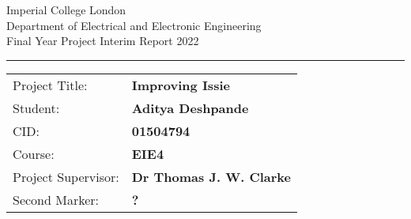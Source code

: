 \begin{titlepage}
                \setlength{\parindent}{0pt}
                \setlength{\parskip}{0pt}

                {
                                \Large
                                \raggedright
                                Imperial College London\\[17pt]
                                Department of Electrical and Electronic Engineering\\[17pt]
                                Final Year Project Interim Report 2022\\[17pt]
 
                }

                \rule{\columnwidth}{3pt}
                \vfill
                \centering

                \setlength{\tabcolsep}{0pt}

                \begin{tabular}{p{40mm}p{\dimexpr\columnwidth-40mm}}
                                Project Title: & \textbf{Improving Issie} \\[12pt]
                                Student: & \textbf{Aditya Deshpande} \\[12pt]
                                CID: & \textbf{01504794} \\[12pt]
                                Course: & \textbf{EIE4} \\[12pt]
                                Project Supervisor: & \textbf{Dr Thomas J. W. Clarke} \\[12pt]
                                Second Marker: & \textbf{?} \\
                \end{tabular}
\end{titlepage}